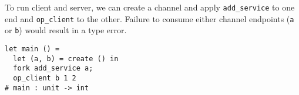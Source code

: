 To run client and server, we can create a channel and apply
\lstinline{add_service} to one end and \lstinline{op_client} to the other.
Failure to consume either channel endpoints (\lstinline/a/ or \lstinline/b/)
would result in a type error.
\begin{lstlisting}
let main () =
  let (a, b) = create () in
  fork add_service a;
  op_client b 1 2
# main : unit -> int
\end{lstlisting}




